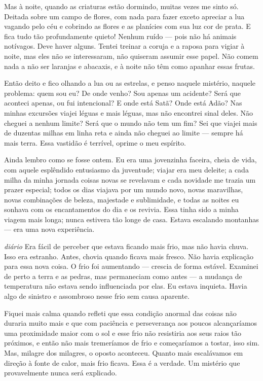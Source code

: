 Mas à noite, quando as criaturas estão dormindo, muitas vezes me sinto só. Deitada
sobre um campo de flores, com nada para fazer exceto apreciar a lua vagando pelo
céu e cobrindo as flores e as planícies com sua luz cor de prata. E fica tudo tão
profundamente quieto! Nenhum ruído --- pois não há animais notívagos. Deve haver
alguns. Tentei treinar a coruja e a raposa para vigiar à noite, mas eles
não se interessaram, não quiseram assumir esse papel. Não comem nada a não ser
laranjas e abacaxis, e à noite não têm como apanhar essas frutas.

Então deito e fico olhando a lua ou as estrelas, e penso naquele
mistério, naquele problema: quem sou eu? De onde venho? Sou apenas um acidente?
Será que aconteci apenas, ou fui intencional? E onde está Satã? Onde está Adão? Nas
minhas excursões viajei léguas e mais léguas, mas não encontrei sinal deles.
Não cheguei a nenhum limite? Será que o mundo não tem um fim? Sei que viajei mais
de duzentas milhas em linha reta e ainda não cheguei ao limite --- sempre há mais
terra. Essa vastidão é terrível, oprime o meu espírito.

Ainda lembro como se fosse ontem. Eu era uma jovenzinha faceira, cheia de vida, com
aquele esplêndido entusiasmo da juventude; viajar era meu deleite; a cada milha da
minha jornada coisas novas se revelavam e cada novidade me trazia um prazer
especial; todos os dias viajava por um mundo novo, novas maravilhas, novas
combinações de beleza, majestade e sublimidade, e todas as noites eu sonhava com
os encantamentos do dia e os revivia. Essa tinha sido a minha viagem
mais longa; nunca estivera tão longe de casa. Estava escalando
montanhas --- era uma nova experiência.

\textit{diário} Era fácil de perceber que estava ficando mais frio, mas não havia chuva.
Isso era estranho. Antes, chovia quando ficava mais fresco. Não havia explicação
para essa nova coisa. O frio foi aumentando --- crescia de forma estável. Examinei
de perto a terra e as pedras, mas permaneciam como antes --- a mudança de
temperatura não estava sendo influenciada por elas. Eu estava inquieta. Havia algo
de sinistro e assombroso nesse frio sem causa aparente.

Fiquei mais calma quando refleti que essa condição anormal das coisas não duraria muito mais
e que com paciência e perseverança aos poucos alcançaríamos uma proximidade
maior com o sol e esse frio não resistiria aos seus raios tão próximos, e então
não mais tremeríamos de frio e começaríamos a tostar, isso sim. Mas, milagre dos
milagres, o oposto aconteceu. Quanto mais escalávamos em direção à fonte de calor,
mais frio ficava. Essa é a verdade. Um mistério que provavelmente
nunca será explicado.

